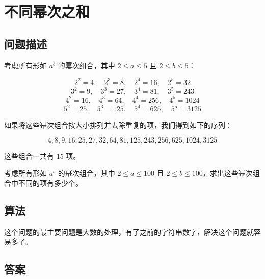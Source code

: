 \section{不同幂次之和}
\subsection{问题描述}
\begin{tcolorbox}
考虑所有形如 \( a^b \) 的幂次组合，其中 \( 2 \leq a \leq 5 \) 且 \( 2 \leq b \leq 5 \)：

\[
2^2 = 4, \quad 2^3 = 8, \quad 2^4 = 16, \quad 2^5 = 32
\]
\[
3^2 = 9, \quad 3^3 = 27, \quad 3^4 = 81, \quad 3^5 = 243
\]
\[
4^2 = 16, \quad 4^3 = 64, \quad 4^4 = 256, \quad 4^5 = 1024
\]
\[
5^2 = 25, \quad 5^3 = 125, \quad 5^4 = 625, \quad 5^5 = 3125
\]

如果将这些幂次组合按大小排列并去除重复的项，我们得到如下的序列：

\[
4, 8, 9, 16, 25, 27, 32, 64, 81, 125, 243, 256, 625, 1024, 3125
\]

这些组合一共有 15 项。

考虑所有形如 \( a^b \) 的幂次组合，其中 \( 2 \leq a \leq 100 \) 且 \( 2 \leq b \leq 100 \)，求出这些幂次组合中不同的项有多少个。

\end{tcolorbox}

\subsection{算法}
这个问题的最主要问题是大数的处理，有了之前的字符串数字，解决这个问题就容易多了。

\subsection{答案}
